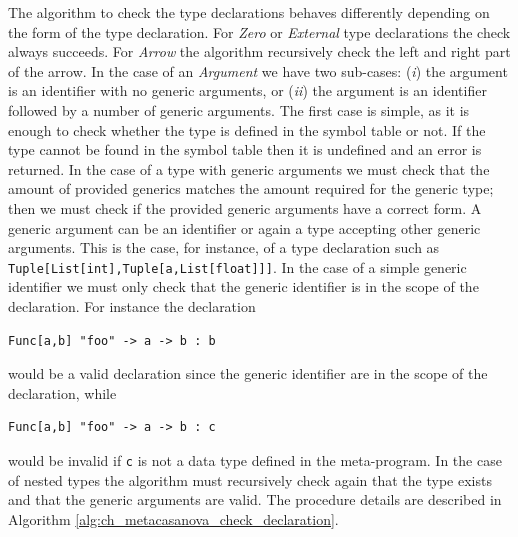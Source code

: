 The algorithm to check the type declarations behaves differently depending on the form of the type declaration. For \textit{Zero} or \textit{External} type declarations the check always succeeds. For \textit{Arrow} the algorithm recursively check the left and right part of the arrow. In the case of an \textit{Argument} we have two sub-cases: (\textit{i}) the argument is an identifier with no generic arguments, or (\textit{ii}) the argument is an identifier followed by a number of generic arguments. The first case is simple, as it is enough to check whether the type is defined in the symbol table or not. If the type cannot be found in the symbol table then it is undefined and an error is returned. In the case of a type with generic arguments we must check that the amount of provided generics matches the amount required for the generic type; then we must check if the provided generic arguments have a correct form. A generic argument can be an identifier or again a type accepting other generic arguments. This is the case, for instance, of a type declaration such as \texttt{Tuple[List[int],Tuple[a,List[float]]]}. In the case of a simple generic identifier we must only check that the generic identifier is in the scope of the declaration. For instance the declaration

\begin{lstlisting}
Func[a,b] "foo" -> a -> b : b
\end{lstlisting}

\noindent
would be a valid declaration since the generic identifier are in the scope of the declaration, while

\begin{lstlisting}
Func[a,b] "foo" -> a -> b : c
\end{lstlisting}

\noindent
would be invalid if \texttt{c} is not a data type defined in the meta-program. In the case of nested types the algorithm must recursively check again that the type exists and that the generic arguments are valid. The procedure details are described in Algorithm \ref{alg:ch_metacasanova_check_declaration}.

